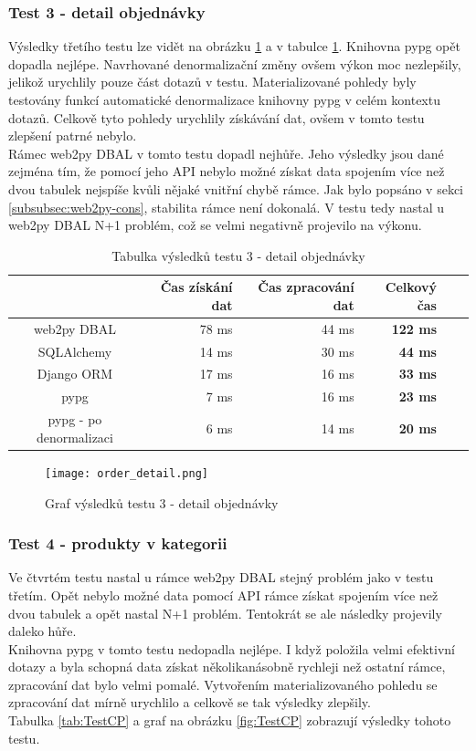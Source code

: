 \documentclass[ing,male,java,dept456]{diploma}						%
\begin{document}
\subsubsection{Test 3 - detail objednávky}
Výsledky třetího testu lze vidět na obrázku \ref{fig:TestOD} a v tabulce \ref{tab:TestOD}. Knihovna pypg opět dopadla nejlépe. Navrhované denormalizační změny ovšem výkon moc nezlepšily, jelikož urychlily pouze část dotazů v testu. Materializované pohledy byly testovány funkcí automatické denormalizace knihovny pypg v celém kontextu dotazů. Celkově tyto pohledy urychlily získávání dat, ovšem v tomto testu zlepšení patrné nebylo. \\
Rámec web2py DBAL v tomto testu dopadl nejhůře. Jeho výsledky jsou dané zejména tím, že pomocí jeho API nebylo možné získat data spojením více než dvou tabulek nejspíše kvůli nějaké vnitřní chybě rámce. Jak bylo popsáno v sekci \ref{subsubsec:web2py-cons}, stabilita rámce není dokonalá. V testu tedy nastal u web2py DBAL N+1 problém, což se velmi negativně projevilo na výkonu.

\begin{table}[h!]
  \centering
  \begin{tabular}{|c|r|r|r|r|r|}
    \hline
    & Čas získání dat & Čas zpracování dat & \textbf{Celkový čas} \\
    \hline
    web2py DBAL & 78 ms & 44 ms & \textbf{122 ms} \\
    \hline
    SQLAlchemy & 14 ms & 30 ms & \textbf{44 ms} \\
    \hline
    Django ORM & 17 ms & 16 ms & \textbf{33 ms} \\
    \hline
    pypg & 7 ms & 16 ms & \textbf{23 ms} \\
    \hline
    pypg - po denormalizaci & 6 ms & 14 ms & \textbf{20 ms} \\
    \hline
  \end{tabular}
  \caption{Tabulka výsledků testu 3 - detail objednávky}
  \label{tab:TestOD}
\end{table}
\begin{figure}[h!]
    \centering
    \texttt{[image: order\_detail.png]}
    \caption{Graf výsledků testu 3 - detail objednávky}
    \label{fig:TestOD}
\end{figure}

\subsubsection{Test 4 - produkty v kategorii}
Ve čtvrtém testu nastal u rámce web2py DBAL stejný problém jako v testu třetím. Opět nebylo možné data pomocí API rámce získat spojením více než dvou tabulek a opět nastal N+1 problém. Tentokrát se ale následky projevily daleko hůře. \\
Knihovna pypg v tomto testu nedopadla nejlépe. I když položila velmi efektivní dotazy a byla schopná data získat několikanásobně rychleji než ostatní rámce, zpracování dat bylo velmi pomalé. Vytvořením materializovaného pohledu se zpracování dat mírně urychlilo a celkově se tak výsledky zlepšily. \\
Tabulka \ref{tab:TestCP} a graf na obrázku \ref{fig:TestCP} zobrazují výsledky tohoto testu.
\end{document}
